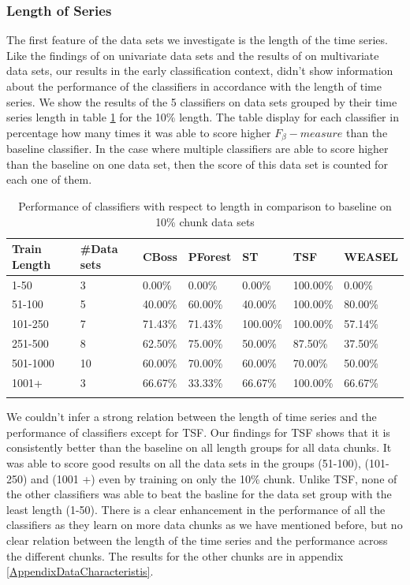\subsubsection{Length of Series}
The first feature of the data sets we investigate is the length of the time series.
Like the findings of \cite{bagnall2017great} on univariate data sets and the results of \cite{fawaz2019deepreview} on multivariate data sets,
our results in the early classification context, didn't show information about the performance of the classifiers in accordance with the length of time series.
We show the results of the 5 classifiers on data sets grouped by their time series length in table \ref{TableLength10} for the 10\% length.
The table display for each classifier in percentage how many times it was able to score higher $F_{\beta}-measure$ than the baseline classifier.
In the case where multiple classifiers are able to score higher than the baseline on one data set, then the score of this data set is counted for each one of them.

\begin{table}[hbt!]
	\setlength\extrarowheight{2pt} %
	\begin{tabularx}{\textwidth}{|X|X|X|X|X|X|X|}
	\hline
	\textbf{Train Length} & \textbf{\#Data sets} & \textbf{CBoss} & \textbf{PForest} & \textbf{ST} & \textbf{TSF} & \textbf{WEASEL} \\ \hline
		1-50 & 3 & 0.00\% & 0.00\% & 0.00\% & 100.00\% & 0.00\% \\ \hline
		51-100 & 5 & 40.00\% & 60.00\% & 40.00\% & 100.00\% & 80.00\% \\ \hline
		101-250 & 7 & 71.43\% & 71.43\% & 100.00\% & 100.00\% & 57.14\% \\ \hline
		251-500 & 8 & 62.50\% & 75.00\% & 50.00\% & 87.50\% & 37.50\% \\ \hline
		501-1000 & 10 & 60.00\% & 70.00\% & 60.00\% & 70.00\% & 50.00\% \\ \hline
		1001+ & 3 & 66.67\% & 33.33\% & 66.67\% & 100.00\% & 66.67\% \\ \hline
	\caption{Performance of classifiers with respect to length in comparison to baseline on 10\% chunk data sets}
	\label{TableLength10}
  \end{tabularx}
\end{table}

We couldn't infer a strong relation between the length of time series and the performance of classifiers except for TSF. 
Our findings for TSF shows that it is consistently better than the baseline on all length groups for all data chunks.
It was able to score good results on all the data sets in the groups (51-100), (101-250) and (1001 +) even by training on only the 10\% chunk.
Unlike TSF, none of the other classifiers was able to beat the basline for the data set group with the least length (1-50).
There is a clear enhancement in the performance of all the classifiers as they learn on more data chunks as we have mentioned before,
but no clear relation between the length of the time series and the performance across the different chunks.
The results for the other chunks are in appendix \ref{AppendixDataCharacteristis}.

